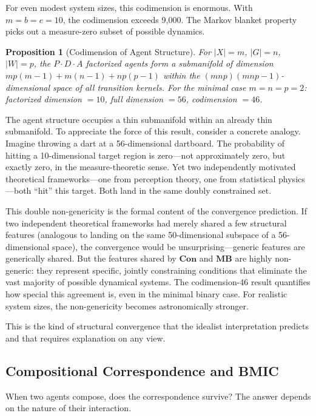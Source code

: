 \documentclass[11pt,a4paper]{article}
\theoremstyle{definition}
\theoremstyle{plain}
\newtheorem{proposition}[definition]{Proposition}
\theoremstyle{remark}
\newcommand{\Con}{\mathbf{Con}}
\newcommand{\MB}{\mathbf{MB}}
\begin{document}
For even modest system sizes, this codimension is enormous. With $m = b = e = 10$, the codimension exceeds 9,000. The Markov blanket property picks out a measure-zero subset of possible dynamics.

\begin{proposition}[Codimension of Agent Structure]
For $|X| = m$, $|G| = n$, $|W| = p$, the $P \cdot D \cdot A$ factorized agents form a submanifold of dimension $mp(m-1) + m(n-1) + np(p-1)$ within the $(mnp)(mnp-1)$-dimensional space of all transition kernels. For the minimal case $m = n = p = 2$: factorized dimension $= 10$, full dimension $= 56$, codimension $= 46$.
\end{proposition}

The agent structure occupies a thin submanifold within an already thin submanifold. To appreciate the force of this result, consider a concrete analogy. Imagine throwing a dart at a 56-dimensional dartboard. The probability of hitting a 10-dimensional target region is zero---not approximately zero, but exactly zero, in the measure-theoretic sense. Yet two independently motivated theoretical frameworks---one from perception theory, one from statistical physics---both ``hit'' this target. Both land in the same doubly constrained set.

This double non-genericity is the formal content of the convergence prediction. If two independent theoretical frameworks had merely shared a few structural features (analogous to landing on the same 50-dimensional subspace of a 56-dimensional space), the convergence would be unsurprising---generic features are generically shared. But the features shared by $\Con$ and $\MB$ are highly non-generic: they represent specific, jointly constraining conditions that eliminate the vast majority of possible dynamical systems. The codimension-46 result quantifies how special this agreement is, even in the minimal binary case. For realistic system sizes, the non-genericity becomes astronomically stronger.

This is the kind of structural convergence that the idealist interpretation predicts and that requires explanation on any view.

\subsection{Compositional Correspondence and BMIC}\label{sec:bmic}

When two agents compose, does the correspondence survive? The answer depends on the nature of their interaction.
\end{document}
